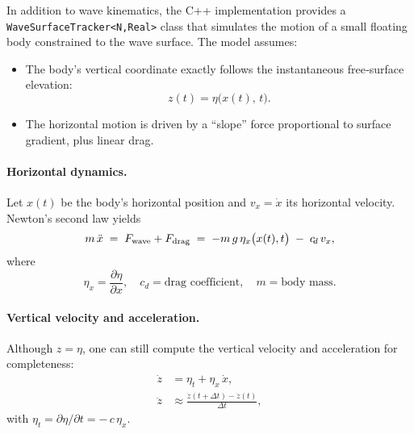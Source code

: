 \documentclass[11pt,letterpaper]{article}
\begin{document}
In addition to wave kinematics, the C++ implementation provides a \texttt{WaveSurfaceTracker<N,Real>} class that simulates the motion of a small floating body constrained to the wave surface.  The model assumes:

\begin{itemize}
  \item The body’s vertical coordinate exactly follows the instantaneous free‐surface elevation:
    \[
      z(t) = \eta\bigl(x(t),\,t\bigr).
    \]
  \item The horizontal motion is driven by a “slope” force proportional to surface gradient, plus linear drag.
\end{itemize}

\paragraph{Horizontal dynamics.}  
Let \(x(t)\) be the body’s horizontal position and \(v_x = \dot x\) its horizontal velocity.  Newton’s second law yields
\begin{equation}
  m\,\ddot x \;=\; F_{\rm wave} + F_{\rm drag}
  \;=\;-m\,g\,\eta_x\bigl(x(t),t\bigr)
    \;-\;c_{\!d}\,v_x,
  \label{eq:tracker_motion}
\end{equation}
where
\[
  \eta_x = \frac{\partial \eta}{\partial x}, 
  \quad
  c_{\!d} = \text{drag coefficient}, 
  \quad
  m = \text{body mass}.
\]

\paragraph{Vertical velocity and acceleration.}  
Although \(z=\eta\), one can still compute the vertical velocity and acceleration for completeness:
\begin{align}
  \dot z &= \eta_t + \eta_x\,\dot x,
  \\
  \ddot z &\approx \frac{\dot z(t+\Delta t)-\dot z(t)}{\Delta t},
\end{align}
with \(\eta_t = \partial\eta/\partial t = -\,c\,\eta_x\).
\end{document}
